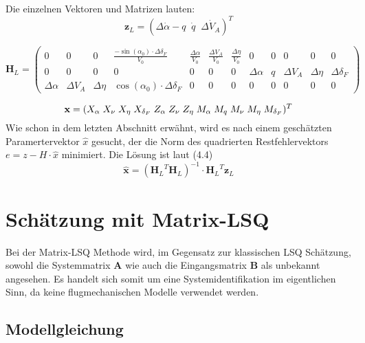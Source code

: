 Die einzelnen Vektoren und Matrizen lauten:
\setcounter{MaxMatrixCols}{15}
\begin{equation}
	\textbf{z}_{L} = (\Delta\dot \alpha-q \;\; \dot q \;\; \Delta\dot V_A)^T
\end{equation}

\begin{equation}
	 \textbf{H}_{L} = \begin{pmatrix}
		0&0&0& \frac{-\sin{(\alpha_0)}\cdot\Delta\delta_F}{V_0} & \frac{\Delta\alpha}{V_0}& \frac{\Delta V_A}{V_0} & 
		\frac{\Delta\eta}{V_0} &0&0&0&0&0   \\
		0&0&0&0&0&0&0 &\Delta\alpha & q & \Delta V_A & \Delta\eta & \Delta\delta_F \\
		\Delta\alpha &  \Delta V_A & \Delta\eta & \cos{(\alpha_0)}\cdot\Delta\delta_F &0&0&0&0&0&0&0&0 
	\end{pmatrix}
\end{equation}

\begin{equation}
	\textbf{x} = (X_{\alpha}\; 
	X_{\nu}\;
	X_{\eta}\;
	X_{\delta_F}\; 
	Z_{\alpha}\; 
	Z_{\nu}\;
	Z_{\eta}\;
	M_{\alpha}\;
	M_{q}\;
	M_{\nu}\;
	M_{\eta}\;
	M_{\delta_F})^T \\
\end{equation}  
Wie schon in dem letzten Abschnitt erwähnt, wird es nach einem geschätzten Paramertervektor $\hat{x}$ gesucht, der die Norm des quadrierten Restfehlervektors $ e = z - H\cdot \hat{x}$ minimiert. Die Lösung ist laut (4.4)
\begin{equation}
    \hat{\textbf{x}}= {({\textbf{H}_L}^{T} {\textbf{H}_L})}^{-1} \cdot {\textbf{H}_L}^{T} \textbf{z}_L 
\end{equation}


\section{Schätzung mit Matrix-LSQ}

Bei der Matrix-LSQ Methode wird, im Gegensatz zur klassischen LSQ Schätzung, sowohl die Systemmatrix \textbf{A} wie auch die Eingangsmatrix \textbf{B} als unbekannt angesehen. Es handelt sich somit um eine Systemidentifikation im eigentlichen Sinn, da keine flugmechanischen Modelle verwendet werden.

\subsection{Modellgleichung}

